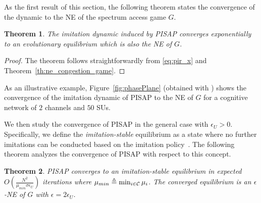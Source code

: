\documentclass[12pt, onecolumn]{IEEEtran}
\theoremstyle{plain}
\newtheorem{theorem}{Theorem}
\theoremstyle{definition}
\begin{document}
As the first result of this section, the following theorem states the convergence of the dynamic to the NE of the spectrum access game $G$.

\begin{theorem}
\label{th:simple}
The imitation dynamic induced by PISAP converges exponentially to an evolutionary equilibrium which is also the NE of $G$.
\end{theorem}

\begin{proof}
The theorem follows straightforwardly from \eqref{eq:pir_x} and Theorem~\ref{th:ne_congestion_game}.
\end{proof}

\begin{comment}

\begin{figure}
\centering
\texttt{[image: aggrPhasePlane.eps]}
\caption{Phase plane of the imitation dynamic of PISAP for $C=2$, $N=50$ and $\mu=[0.3, 0.8]$}
\label{fig:phasePlane}
\vspace{1.5cm}
\end{figure}

\end{comment}

As an illustrative example, Figure~\ref{fig:phasePlane} (obtained with \cite{Polkingpplane}) shows the convergence of the imitation dynamic of PISAP to the NE of $G$ for a cognitive network of $2$ channels and $50$ SUs.

We then study the convergence of PISAP in the general case with $\epsilon_U>0$. Specifically, we define the \textit{imitation-stable} equilibrium as a state where no further imitations can be conducted based on the imitation policy~\cite{Ackermann09}. The following theorem analyzes the convergence of PISAP with respect to this concept.

\begin{theorem}
\label{th:convergence_simple}
PISAP converges to an imitation-stable equilibrium in expected $O(\frac{N^2}{\mu_{min}\sigma\epsilon_U})$ iterations where $\mu_{min}\triangleq  \min_{i \in {\cal C}} \mu_i$. The converged equilibrium is an $\epsilon$-NE of $G$ with $\epsilon=2\epsilon_U$.
\end{theorem}
\end{document}
